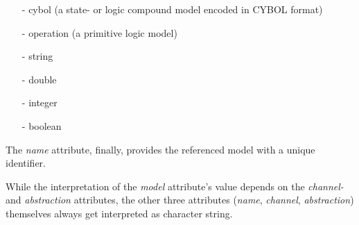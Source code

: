 \newpage

\begin{itemize}
    \item[-] cybol (a state- or logic compound model encoded in CYBOL format)
    \item[-] operation (a primitive logic model)
    \item[-] string
    \item[-] double
    \item[-] integer
    \item[-] boolean
\end{itemize}

The \emph{name} attribute, finally, provides the referenced model with a unique
identifier.

While the interpretation of the \emph{model} attribute's value depends on the
\emph{channel-} and \emph{abstraction} attributes, the other three attributes
(\emph{name}, \emph{channel}, \emph{abstraction}) themselves always get
interpreted as character string.
